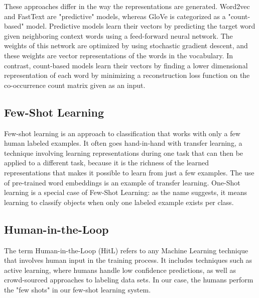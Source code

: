 \documentclass{article} %
\begin{document}
These approaches differ in the way the representations are generated.  Word2vec and FastText are "predictive" models, whereas GloVe is categorized as a "count-based" model.  Predictive models learn their vectors by predicting the target word given neighboring context words using a feed-forward neural network. The weights of this network are optimized by using stochastic gradient descent, and these weights are vector representations of the words in the vocabulary. In contrast, count-based models learn their vectors by finding a lower dimensional representation of each word by minimizing a reconstruction loss function on the co-occurrence count matrix given as an input.

\subsection*{Few-Shot Learning}
Few-shot learning is an approach to classification that works with only a few human labeled examples. It often goes hand-in-hand with transfer learning, a technique involving learning representations during one task that can then be applied to a different task, because it is the richness of the learned representations that makes it possible to learn from just a few examples. The use of pre-trained word embeddings is an example of transfer learning. One-Shot learning is a special case of Few-Shot Learning: as the name suggests, it means learning to classify objects when only one labeled example exists per class.

\subsection*{Human-in-the-Loop}
The term Human-in-the-Loop (HitL) refers to any Machine Learning technique that involves human input in the training process. It includes techniques such as active learning, where humans handle low confidence predictions, as well as crowd-sourced approaches to labeling data sets. In our case, the humans perform the "few shots" in our few-shot learning system.
\end{document}
